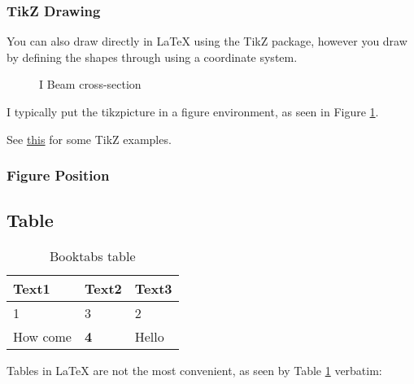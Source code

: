 \documentclass[11pt,a4paper,titlepage]{article}
\begin{document}
\subsubsection{TikZ Drawing}
You can also draw directly in \LaTeX{} using the TikZ package, however you draw by defining the shapes through using a coordinate system.


\begin{figure}[h]
\centering

\caption{I Beam cross-section}
\label{fig:I_beam}
\end{figure}


I typically put the tikzpicture in a figure environment, as seen in Figure \ref{fig:I_beam}.

See \href{http://texample.net/TikZ/}{this} for some TikZ examples.
\subsubsection{Figure Position}


\subsection{Table}

\begin{table}[h]
\centering
\caption{Booktabs table}
\label{tbl:table1}
\begin{tabular}{@{}lll@{}}
\toprule
Text1    & Text2      & Text3 \\ \midrule
1        & 3          & 2     \\
How come & \textbf{4} & Hello \\ \bottomrule
\end{tabular}
\end{table}


Tables in \LaTeX{} %
are not the most convenient, as seen by Table \ref{tbl:table1} verbatim:
\end{document}
